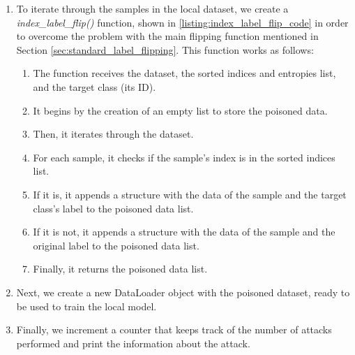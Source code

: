 \begin{enumerate}
        \item To iterate through the samples in the local dataset, we create a \textit{index\_label\_flip()} function, shown in \autoref{listing:index_label_flip_code} in order to overcome the problem with the main flipping function mentioned in Section \ref{sec:standard_label_flipping}. This function works as follows:
                \begin{enumerate}
                        \item The function receives the dataset, the sorted indices and entropies list, and the target class (its ID).
                        \item It begins by the creation of an empty list to store the poisoned data.
                        \item Then, it iterates through the dataset.
                        \item For each sample, it checks if the sample's index is in the sorted indices list.
                        \item If it is, it appends a structure with the data of the sample and the target class's label to the poisoned data list.
                        \item If it is not, it appends a structure with the data of the sample and the original label to the poisoned data list.
                        \item Finally, it returns the poisoned data list.
                \end{enumerate}
        \item Next, we create a new DataLoader object with the poisoned dataset, ready to be used to train the local model.
        \item Finally, we increment a counter that keeps track of the number of attacks performed and print the information about the attack.
\end{enumerate}

